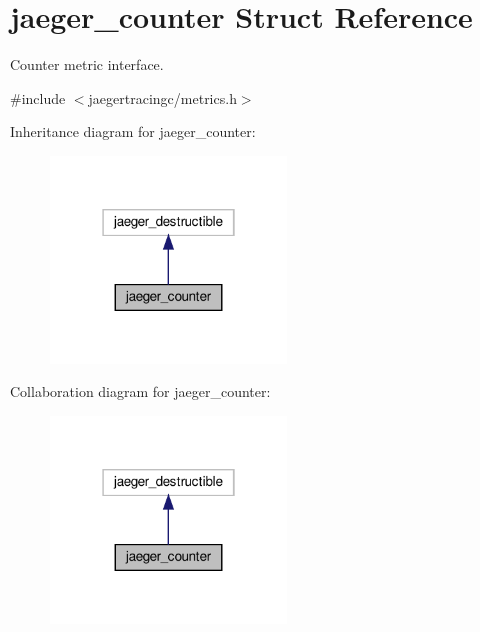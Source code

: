 \hypertarget{structjaeger__counter}{}\section{jaeger\+\_\+counter Struct Reference}
\label{structjaeger__counter}


Counter metric interface.  




{\ttfamily \#include $<$jaegertracingc/metrics.\+h$>$}



Inheritance diagram for jaeger\+\_\+counter\+:\nopagebreak
\begin{figure}[H]
\begin{center}
\leavevmode
\includegraphics[width=178pt]{structjaeger__counter__inherit__graph}
\end{center}
\end{figure}


Collaboration diagram for jaeger\+\_\+counter\+:\nopagebreak
\begin{figure}[H]
\begin{center}
\leavevmode
\includegraphics[width=178pt]{structjaeger__counter__coll__graph}
\end{center}
\end{figure}
